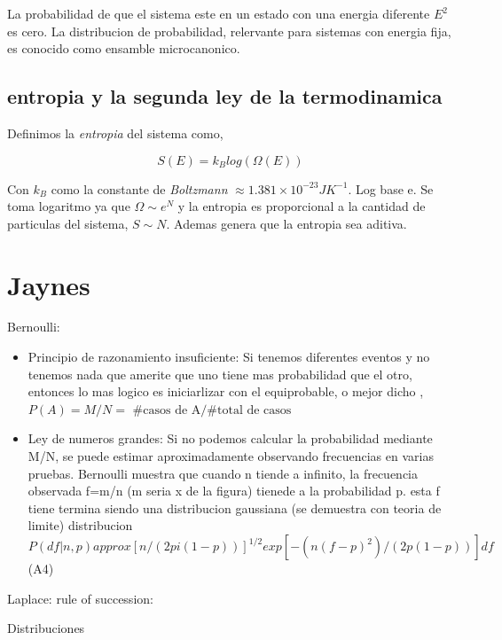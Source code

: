 \documentclass[20pt]{extarticle}
\begin{document}
La probabilidad de que el sistema este en un estado con una energia diferente $E^2$ es cero.
La distribucion de probabilidad, relervante para sistemas con energia fija, es conocido como ensamble microcanonico.

\subsection{entropia y la segunda ley de la termodinamica}

Definimos la \textit{entropia} del sistema como,

\begin{equation}
	S(E) = k_B log(\Omega(E))
\end{equation}

Con $k_B$ como la constante de \textit{Boltzmann} $\approx1.381 \times 10^{-23}JK^{-1}$.
Log base e.
Se toma logaritmo ya que $\Omega\sim e^N$ y la entropia es proporcional a la cantidad de particulas del sistema, $S\sim N$.
Ademas genera que la entropia sea aditiva.


\section{Jaynes}
Bernoulli:
\begin{itemize}
	\item Principio de razonamiento insuficiente: Si tenemos diferentes eventos y no tenemos nada que amerite que uno tiene mas probabilidad que el otro, entonces lo mas logico es iniciarlizar con el equiprobable, o mejor dicho ,$P(A) =M/N=$ $\#\text{casos de A}/ \#\text{total de casos}$
	\item Ley de numeros grandes: Si no podemos calcular la probabilidad mediante M/N, se puede estimar aproximadamente observando frecuencias en varias pruebas. Bernoulli muestra que cuando n tiende a infinito, la frecuencia observada f=m/n (m seria x de la figura) tienede a la probabilidad p. esta f tiene termina siendo una distribucion gaussiana (se demuestra con teoria de limite)
		distribucion $P(df|n,p) approx [n/(2pi(1-p))]^{1/2}  exp[-(n(f-p)^2)/(2p(1-p))]df$  (A4)
\end{itemize}
Laplace:
rule of succession:

Distribuciones
\end{document}
